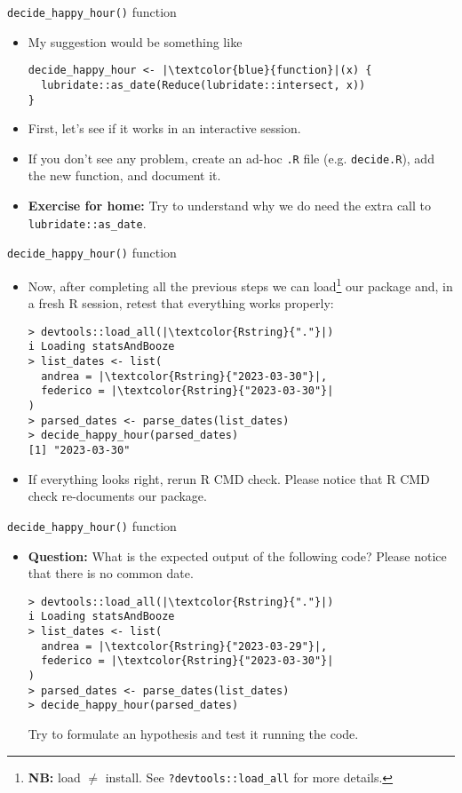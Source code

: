 \documentclass[
hyperref={bookmarks=false},
xcolor={dvipsnames,svgnames*,x11names*}, 
12pt
]{beamer}
\begin{document}
\begin{frame}[fragile]{\texttt{decide\_happy\_hour()} function}
\vspace{-0.5cm}
\begin{itemize}
\itemsep 2ex
\item My suggestion would be something like
\begin{lstlisting}
decide_happy_hour <- |\textcolor{blue}{function}|(x) {
  lubridate::as_date(Reduce(lubridate::intersect, x))
}
\end{lstlisting}
\item First, let's see if it works in an interactive session. 
\item If you don't see any problem, create an ad-hoc \texttt{.R} file (e.g. \texttt{decide.R}), add the new function, and document it. 
\item \textbf{Exercise for home:} Try to understand why we do need the extra call to \texttt{lubridate::as\_date}.
\end{itemize}
\end{frame}

\begin{frame}[fragile]{\texttt{decide\_happy\_hour()} function}
\vspace{-0.5cm}
\begin{itemize}
\itemsep 2ex
\item Now, after completing all the previous steps we can load\footnote{\textbf{NB:} load $\ne$ install. See \texttt{?devtools::load\_all} for more details.} our package and, in a fresh R session, retest that everything works properly: 
\begin{lstlisting}
> devtools::load_all(|\textcolor{Rstring}{"."}|)
i Loading statsAndBooze
> list_dates <- list(
  andrea = |\textcolor{Rstring}{"2023-03-30"}|, 
  federico = |\textcolor{Rstring}{"2023-03-30"}|
)
> parsed_dates <- parse_dates(list_dates)
> decide_happy_hour(parsed_dates)
[1] "2023-03-30"
\end{lstlisting}
\item If everything looks right, rerun R CMD check. Please notice that R CMD check re-documents our package. 
\end{itemize}
\end{frame}

\begin{frame}[fragile]{\texttt{decide\_happy\_hour()} function}
\vspace{-0.5cm}
\begin{itemize}
\itemsep 2ex
\item \textbf{Question:} What is the expected output of the following code? Please notice that there is no common date.  
\begin{lstlisting}
> devtools::load_all(|\textcolor{Rstring}{"."}|)
i Loading statsAndBooze
> list_dates <- list(
  andrea = |\textcolor{Rstring}{"2023-03-29"}|, 
  federico = |\textcolor{Rstring}{"2023-03-30"}|
)
> parsed_dates <- parse_dates(list_dates)
> decide_happy_hour(parsed_dates)
\end{lstlisting}
Try to formulate an hypothesis and test it running the code. 
\end{itemize}
\end{frame}
\end{document}
